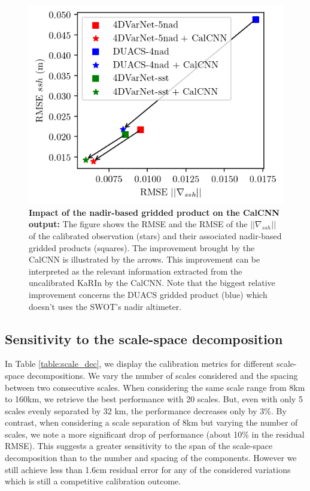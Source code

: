 \begin{bibunit}
\begin{figure}
    \begin{center}
        \includegraphics{00_Calib/gridded_impact.png}
    \end{center}
    \caption{{\bf Impact of the nadir-based gridded product on the CalCNN output:} The figure shows the RMSE and the RMSE of the $|| \nabla_{ssh} ||$ of the calibrated observation (stars) and their associated nadir-based gridded products (squares). The improvement brought by the CalCNN is illustrated by the arrows. This improvement can be interpreted as the relevant information extracted from the uncalibrated KaRIn by the CalCNN. Note that the biggest relative improvement concerns the DUACS gridded product (blue) which doesn't uses the SWOT's nadir altimeter.}
    \label{fig:gridded_impact}
\end{figure}

\subsection{Sensitivity to the scale-space decomposition}
\label{subsec:decomp_sens}
\noindent
In Table \ref{table:scale_dec}, we display the calibration metrics for different scale-space decompositions. We vary the number of scales considered and the spacing between two consecutive scales. When considering the same scale range from 8km to 160km, we retrieve the best performance with 20 scales. But, even with only 5 scales evenly separated by 32 km, the performance decreases only by 3\%.
By contrast, when considering a scale separation of 8km but varying the number of scales, we note a more significant drop of performance (about 10\% in the residual RMSE). This suggests a greater sensitivity to the span of the scale-space decomposition than to the number and spacing of the components. 
However we still achieve less than 1.6cm residual error for any of the considered variations which is still a competitive calibration outcome.


\end{bibunit}
